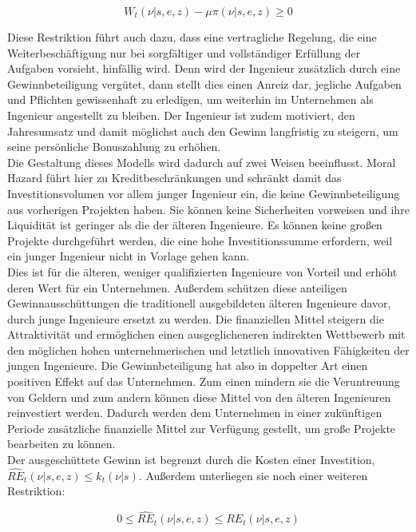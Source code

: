 	\begin{equation}
		W_t(\nu|s,e,z)-\mu\pi(\nu|s,e,z)\geq 0
	\end{equation}


Diese Restriktion führt auch dazu, dass eine vertragliche Regelung, die eine Weiterbeschäftigung nur bei sorgfältiger und vollständiger Erfüllung der Aufgaben vorsieht, hinfällig wird. Denn wird der Ingenieur zusätzlich durch eine Gewinnbeteiligung vergütet, dann stellt dies einen Anreiz dar, jegliche Aufgaben und Pflichten gewissenhaft zu erledigen, um weiterhin im Unternehmen als Ingenieur angestellt zu bleiben. Der Ingenieur ist zudem motiviert, den Jahresumsatz und damit möglichst auch den Gewinn langfristig zu steigern, um seine persönliche Bonuszahlung zu erhöhen.\\


Die Gestaltung dieses Modells wird dadurch auf zwei Weisen beeinflusst. Moral Hazard führt hier zu Kreditbeschränkungen und schränkt damit das Investitionsvolumen vor allem junger Ingenieur ein, die keine Gewinnbeteiligung aus vorherigen Projekten haben. Sie können keine Sicherheiten vorweisen und ihre Liquidität ist geringer als die der älteren Ingenieure. Es können keine gro{\ss}en Projekte durchgeführt werden, die eine hohe Investitionssumme erfordern, weil ein junger Ingenieur nicht in Vorlage gehen kann.\\
Dies ist für die älteren, weniger qualifizierten Ingenieure von Vorteil und erhöht deren Wert für ein Unternehmen. Au{\ss}erdem schützen diese anteiligen Gewinnausschüttungen die traditionell ausgebildeten älteren Ingenieure davor, durch junge Ingenieure ersetzt zu werden. Die finanziellen Mittel steigern die Attraktivität und ermöglichen einen ausgeglicheneren indirekten Wettbewerb mit den möglichen hohen unternehmerischen und letztlich innovativen Fähigkeiten der jungen Ingenieure. Die Gewinnbeteiligung hat also in doppelter Art einen positiven Effekt auf das Unternehmen. Zum einen mindern sie die Veruntreuung von Geldern und zum andern können diese Mittel von den älteren Ingenieuren reinvestiert werden. Dadurch werden dem Unternehmen in einer zukünftigen Periode zusätzliche finanzielle Mittel zur Verfügung gestellt, um gro{\ss}e Projekte bearbeiten zu können. \\


Der ausgeschüttete Gewinn ist begrenzt durch die Kosten einer Investition, $\widehat{RE}_t(\nu|s,e,z)\leq k_t(\nu|s)$. Au{\ss}erdem unterliegen sie noch einer weiteren Restriktion:


	\begin{equation}
		0\leq\widehat{RE}_t(\nu|s,e,z)\leq RE_t(\nu|s,e,z)
	\end{equation}

